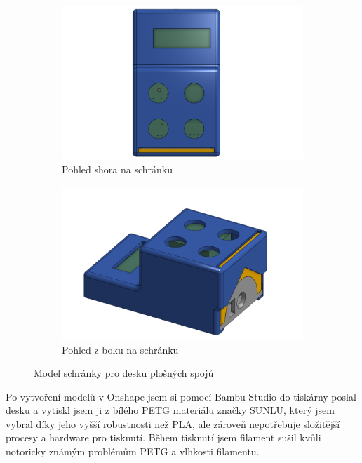 \begin{figure}[H]
    \centering
    \begin{subfigure}[t]{0.48\textwidth}
        \includegraphics[width=\textwidth]{images/krabickaTop.png}
        \caption{Pohled shora na schránku}
        \label{fig:krabickaTop}
    \end{subfigure}%
    \hfill
    \begin{subfigure}[t]{0.48\textwidth}
        \includegraphics[width=\textwidth]{images/KrabickaZBoku.png}
        \caption{Pohled z boku na schránku}
        \label{fig:KrabickaZBoku}
    \end{subfigure}
    \caption{Model schránky pro desku plošných spojů}
    \label{fig:krabickaObaPohledy}
\end{figure}

Po vytvoření modelů v Onshape jsem si pomocí Bambu Studio do tiskárny poslal desku a vytiskl jsem ji z bílého PETG materiálu značky SUNLU, který jsem vybral díky jeho vyšší robustnosti než PLA, ale zároveň nepotřebuje složitější procesy a hardware pro tisknutí. Během tisknutí jsem filament sušil kvůli notoricky známým problémům PETG a vlhkosti filamentu.

